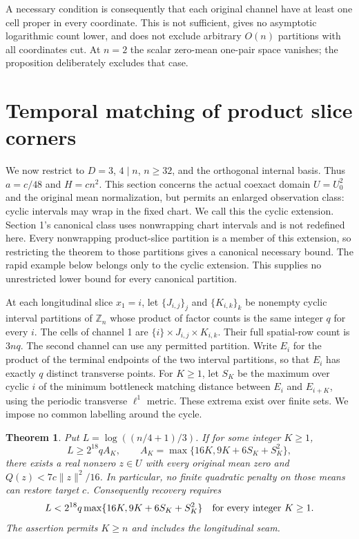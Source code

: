 \documentclass[11pt,a4paper]{article}
\newtheorem{theorem}{Theorem}[section]
\newcommand{\Z}{\mathbb Z}
\newcommand{\norm}[1]{\lVert#1\rVert}
\begin{document}
A necessary condition is consequently that each original channel have at
least one cell proper in every coordinate. This is not sufficient, gives
no asymptotic logarithmic count lower, and does not exclude arbitrary
$O(n)$ partitions with all coordinates cut. At $n=2$ the scalar zero-mean
one-pair space vanishes; the proposition deliberately excludes that case.

\section{Temporal matching of product slice corners}\label{sec:temporal}
We now restrict to $D=3$, $4\mid n$, $n\geq32$, and the orthogonal
internal basis. Thus $a=c/48$ and $H=cn^2$. This section concerns the actual
coexact domain $U=U_0^2$ and the original mean normalization, but permits
an enlarged observation class: cyclic intervals may wrap in the fixed
chart. We call this the cyclic extension. Section 1's canonical class
uses nonwrapping chart intervals and is not redefined here. Every
nonwrapping product-slice partition is a member of this extension, so
restricting the theorem to those partitions gives a canonical necessary
bound. The rapid example below belongs only to the cyclic extension.
This supplies no unrestricted lower bound for every canonical partition.

At each longitudinal slice $x_1=i$, let $\{J_{i,j}\}_j$ and
$\{K_{i,k}\}_k$ be nonempty cyclic interval partitions of $\Z_n$ whose
product of factor counts is the same integer $q$ for every $i$. The cells
of channel 1 are $\{i\}\times J_{i,j}\times K_{i,k}$. Their full spatial-row
count is $3nq$. The second channel can use any permitted partition. Write
$E_i$ for the product of the terminal endpoints of the two interval
partitions, so that $E_i$ has exactly $q$ distinct transverse points.
For $K\geq1$, let $S_K$ be the maximum over cyclic $i$ of the minimum
bottleneck matching distance between $E_i$ and $E_{i+K}$, using the
periodic transverse $\ell^1$ metric. These extrema exist over finite sets.
We impose no common labelling around the cycle.

\begin{theorem}\label{thm:temporal}
Put $L=\log((n/4+1)/3)$. If for some integer $K\geq1$,
\begin{equation}\label{eq:windowthreshold}
 L\geq 2^{18}q A_K,\qquad
 A_K=\max\{16K,9K+6S_K+S_K^2\},
\end{equation}
there exists a real nonzero $z\in U$ with every original mean zero and
$Q(z)<7c\norm z^2/16$. In particular, no finite quadratic penalty on those
means can restore target $c$. Consequently recovery requires
\begin{equation}\label{eq:windownecessary}
 L<2^{18}q\max\{16K,9K+6S_K+S_K^2\}
 \quad\hbox{for every integer }K\geq1.
\end{equation}
The assertion permits $K\geq n$ and includes the longitudinal seam.
\end{theorem}
\end{document}

